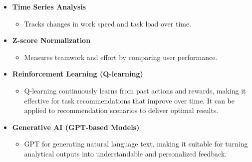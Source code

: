 \begin{itemize}
\begin{itemize}
            \item \textbf{Time Series Analysis}  
            \begin{itemize}
                \item Tracks changes in work speed and task load over time.
            \end{itemize}

            \item \textbf{Z-score Normalization}  
            \begin{itemize}
                \item Measures teamwork and effort by comparing user performance.
            \end{itemize}

            \item \textbf{Reinforcement Learning (Q-learning)}  
            \begin{itemize}
                \item Q-learning continuously learns from past actions and rewards, making it effective for task recommendations that improve over time. It can be applied to recommendation scenarios to deliver optimal results.
            \end{itemize}

            \item \textbf{Generative AI (GPT-based Models)}  
            \begin{itemize}
                \item GPT for generating natural language text, making it suitable for turning analytical outputs into understandable and personalized feedback.
            \end{itemize}
        \end{itemize}


\end{itemize}
